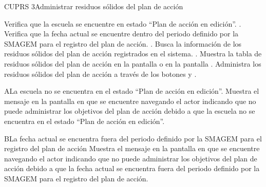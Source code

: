 \begin{UseCase}{CUPRS 3}{Administrar residuos sólidos del plan de acción}


\end{UseCase}

 \begin{UCtrayectoria}
 \UCpaso[\UCsist] Verifica que la escuela se encuentre en  estado ``Plan de acción en edición''. .
    \UCpaso[\UCsist] Verifica que la fecha actual se encuentre dentro del periodo definido por la SMAGEM para el registro del plan de acción. .
    \UCpaso[\UCsist] Busca la información de los residuos sólidos del plan de acción registrados en el sistema. .
    \UCpaso[\UCsist] Muestra la tabla de residuos sólidos del plan de acción en la pantalla  o en la pantalla .
    \UCpaso[\UCactor] Administra los residuos sólidos del plan de acción a través de los botones  y \botKo  . \label{cuprs3:Registrar}
 \end{UCtrayectoria}
 
\begin{UCtrayectoriaA}{A}{La escuela no se encuentra en el estado ``Plan de acción en edición''.}
    \UCpaso[\UCsist] Muestra el mensaje  en la pantalla en que se encuentre navegando el actor indicando que no puede administrar los objetivos del plan de acción debido a que la escuela no se encuentra en el estado ``Plan de acción en edición''. 
 \end{UCtrayectoriaA}
 
   \begin{UCtrayectoriaA}{B}{La fecha actual se encuentra fuera del periodo definido por la SMAGEM para el registro del plan de acción}
    \UCpaso[\UCsist] Muestra el mensaje  en la pantalla en que se encuentre navegando el actor indicando que no puede administrar los objetivos del plan de acción debido a que la fecha actual se encuentra fuera del periodo definido por la SMAGEM para el registro del plan de acción.
 \end{UCtrayectoriaA}
 
